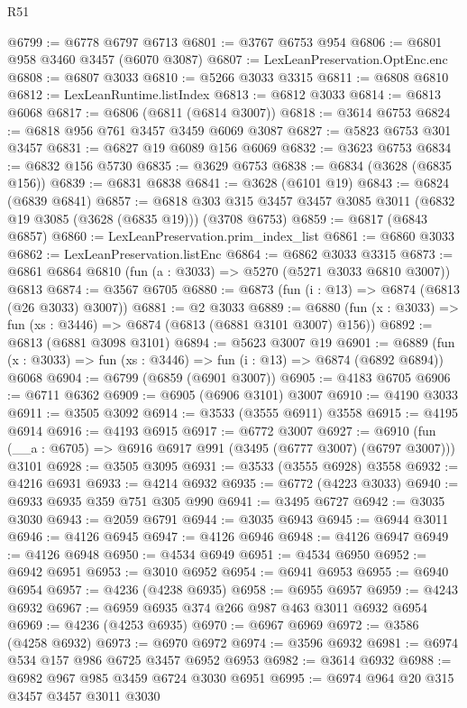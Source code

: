 \begin{lexlean}{R51}
\begin{coremodule}
@6799 := @6778 @6797 @6713
@6801 := @3767 @6753 @954
@6806 := @6801 @958 @3460 @3457 (@6070 @3087)
@6807 := LexLeanPreservation.OptEnc.enc
@6808 := @6807 @3033
@6810 := @5266 @3033 @3315
@6811 := @6808 @6810
@6812 := LexLeanRuntime.listIndex
@6813 := @6812 @3033
@6814 := @6813 @6068
@6817 := @6806 (@6811 (@6814 @3007))
@6818 := @3614 @6753
@6824 := @6818 @956 @761 @3457 @3459 @6069 @3087
@6827 := @5823 @6753 @301 @3457
@6831 := @6827 @19 @6089 @156 @6069
@6832 := @3623 @6753
@6834 := @6832 @156 @5730
@6835 := @3629 @6753
@6838 := @6834 (@3628 (@6835 @156))
@6839 := @6831 @6838
@6841 := @3628 (@6101 @19)
@6843 := @6824 (@6839 @6841)
@6857 := @6818 @303 @315 @3457 @3457 @3085 @3011 (@6832 @19 @3085 (@3628 (@6835 @19))) (@3708 @6753)
@6859 := @6817 (@6843 @6857)
@6860 := LexLeanPreservation.prim_index_list
@6861 := @6860 @3033
@6862 := LexLeanPreservation.listEnc
@6864 := @6862 @3033 @3315
@6873 := @6861 @6864 @6810 (fun (a : @3033) => @5270 (@5271 @3033 @6810 @3007)) @6813
@6874 := @3567 @6705
@6880 := @6873 (fun (i : @13) => @6874 (@6813 (@26 @3033) @3007))
@6881 := @2 @3033
@6889 := @6880 (fun (x : @3033) => fun (xs : @3446) => @6874 (@6813 (@6881 @3101 @3007) @156))
@6892 := @6813 (@6881 @3098 @3101)
@6894 := @5623 @3007 @19
@6901 := @6889 (fun (x : @3033) => fun (xs : @3446) => fun (i : @13) => @6874 (@6892 @6894)) @6068
@6904 := @6799 (@6859 (@6901 @3007))
@6905 := @4183 @6705
@6906 := @6711 @6362
@6909 := @6905 (@6906 @3101) @3007
@6910 := @4190 @3033
@6911 := @3505 @3092
@6914 := @3533 (@3555 @6911) @3558
@6915 := @4195 @6914
@6916 := @4193 @6915
@6917 := @6772 @3007
@6927 := @6910 (fun (__a : @6705) => @6916 @6917 @991 (@3495 (@6777 @3007) (@6797 @3007))) @3101
@6928 := @3505 @3095
@6931 := @3533 (@3555 @6928) @3558
@6932 := @4216 @6931
@6933 := @4214 @6932
@6935 := @6772 (@4223 @3033)
@6940 := @6933 @6935 @359 @751 @305 @990
@6941 := @3495 @6727
@6942 := @3035 @3030
@6943 := @2059 @6791
@6944 := @3035 @6943
@6945 := @6944 @3011
@6946 := @4126 @6945
@6947 := @4126 @6946
@6948 := @4126 @6947
@6949 := @4126 @6948
@6950 := @4534 @6949
@6951 := @4534 @6950
@6952 := @6942 @6951
@6953 := @3010 @6952
@6954 := @6941 @6953
@6955 := @6940 @6954
@6957 := @4236 (@4238 @6935)
@6958 := @6955 @6957
@6959 := @4243 @6932
@6967 := @6959 @6935 @374 @266 @987 @463 @3011 @6932 @6954
@6969 := @4236 (@4253 @6935)
@6970 := @6967 @6969
@6972 := @3586 (@4258 @6932)
@6973 := @6970 @6972
@6974 := @3596 @6932
@6981 := @6974 @534 @157 @986 @6725 @3457 @6952 @6953
@6982 := @3614 @6932
@6988 := @6982 @967 @985 @3459 @6724 @3030 @6951
@6995 := @6974 @964 @20 @315 @3457 @3457 @3011 @3030

\end{coremodule}
\end{lexlean}
